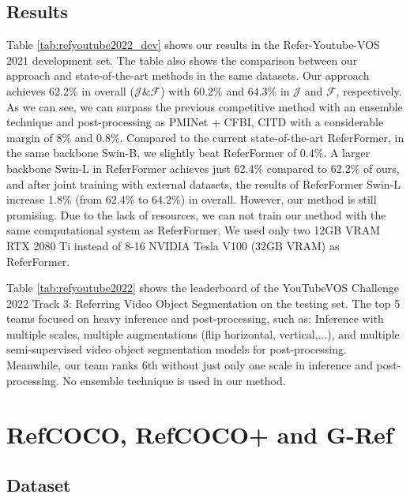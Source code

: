 \subsection{Results}



Table \ref{tab:refyoutube2022_dev} shows our results in the Refer-Youtube-VOS 2021 development set. The table also shows the comparison between our approach and state-of-the-art methods in the same datasets. Our approach achieves 62.2\% in overall ($\mathcal{J\&F}$) with 60.2\% and $64.3\%$ in $\mathcal{J}$ and $\mathcal{F}$, respectively. As we can see, we can surpass the previous competitive method with an ensemble technique and post-processing as PMINet + CFBI, CITD\cite{liang_rethinking_nodate} with a considerable margin of 8\% and 0.8\%. Compared to the current state-of-the-art ReferFormer\cite{wu_language_2022}, in the same backbone Swin-B, we slightly beat ReferFormer of 0.4\%. A larger backbone Swin-L in ReferFormer achieves just 62.4\% compared to 62.2\% of ours, and after joint training with external datasets, the results of ReferFormer Swin-L increase 1.8\% (from 62.4\% to 64.2\%) in overall. However, our method is still promising. Due to the lack of resources, we can not train our method with the same computational system as ReferFormer. We used only two 12GB VRAM RTX 2080 Ti instead of 8-16 NVIDIA Tesla V100 (32GB VRAM) as ReferFormer. 

Table \ref{tab:refyoutube2022} shows the leaderboard of the YouTubeVOS Challenge 2022 Track 3: Referring Video Object Segmentation on the testing set. The top 5 teams focused on heavy inference and post-processing, such as: Inference with multiple scales, multiple augmentations (flip horizontal, vertical,...), and multiple semi-supervised video object segmentation models for post-processing. Meanwhile, our team  ranks 6th without just only one scale in inference and post-processing. No ensemble technique is used in our method.

\section{RefCOCO, RefCOCO+ and G-Ref}
\label{sec:ris_dataset}
\subsection{Dataset}

